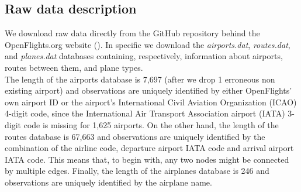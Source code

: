 \documentclass{Template resources/netsci-project}
\begin{document}
\subsection{Raw data description}
We download raw data directly from the GitHub repository behind the OpenFlights.org website (\cite{OpenFlights2008}). In specific we download the \textit{airports.dat}, \textit{routes.dat}, and \textit{planes.dat} databases containing, respectively, information about airports, routes between them, and plane types. \\
The length of the airports database is 7,697 (after we drop 1 erroneous non existing airport) and observations are uniquely identified by either OpenFlights' own airport ID or the airport's International Civil Aviation Organization (ICAO) 4-digit code, since the International Air Transport Association airport (IATA) 3-digit code is missing for 1,625 airports. On the other hand, the length of the routes database is 67,663 and observations are uniquely identified by the combination of the airline code, departure airport IATA code and arrival airport IATA code. This means that, to begin with, any two nodes might be connected by multiple edges. Finally, the length of the airplanes database is 246 and observations are uniquely identified by the airplane name.

\end{document}
